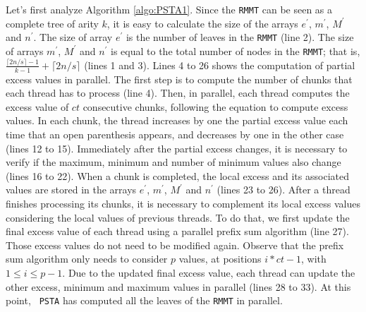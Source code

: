 Let's first analyze Algorithm \ref{algo:PSTA1}. Since the {\tt RMMT}
can be seen as a complete tree of arity $k$, it is easy to calculate
the size of the arrays $e^{\prime}$, $m^{\prime}$, $M^{\prime}$ and
$n^{\prime}$. The size of array $e^{\prime}$ is the number of leaves
in the {\tt RMMT} (line 2). The size of arrays $m^{\prime}$,
$M^{\prime}$ and $n^{\prime}$ is equal to the total number of nodes in
the {\tt RMMT}; that is, $\frac{\lceil 2n/s \rceil-1}{k-1} + \lceil
2n/s \rceil$ (lines 1 and 3). Lines 4 to 26 shows the computation of
partial excess values in parallel. The first step is to compute the
number of chunks that each thread has to process (line 4). Then, in
parallel, each thread computes the excess value of $ct$ consecutive
chunks, following the equation to compute excess values. In each chunk, the
thread increases by one the partial excess value each time that an
open parenthesis appears, and decreases by one in the other case
(lines 12 to 15). Immediately after the partial excess changes, it is
necessary to verify if the maximum, minimum and number of minimum
values also change (lines 16 to 22). When a chunk is completed, the
local excess and its associated values are stored in the arrays
$e^{\prime}$, $m^{\prime}$, $M^{\prime}$ and $n^{\prime}$ (lines 23 to
26). After a thread finishes processing its chunks, it is necessary to
complement its local excess values considering the local values of
previous threads. To do that, we first update the final excess value
of each thread using a parallel prefix sum algorithm (line 27). 
Those excess values do not need to be modified again. Observe that
the prefix sum algorithm only needs to consider $p$ values, at positions
$i*ct-1$, with $1\leq i \leq p-1$. Due to the updated final excess value,
each thread can update the other excess, minimum and maximum values in
parallel (lines 28 to 33). At this point, {\tt
  PSTA} has computed all the leaves of the {\tt RMMT} in parallel.


